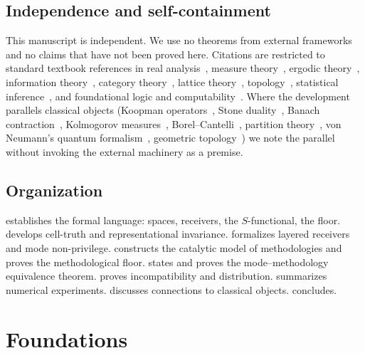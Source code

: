 \documentclass[twocolumn,11pt,a4paper]{article}
\begin{document}
\subsection{Independence and self-containment}

This manuscript is independent. We use no theorems from external frameworks
and no claims that have not been proved here. Citations are restricted to
standard textbook references in real analysis~\cite{rudin1987},
measure theory~\cite{halmos1950}, ergodic theory~\cite{walters1982,birkhoff1931},
information theory~\cite{shannon1948,coverthomas2006,kullback1951},
category theory~\cite{maclane1998}, lattice theory~\cite{birkhoff1967},
topology~\cite{kelley1955}, statistical inference~\cite{lehmann2006,wasserman2004,fisher1925},
and foundational logic and computability~\cite{godel1931,tarski1933,turing1936,chaitin1974}.
Where the development parallels classical objects (Koopman
operators~\cite{koopman1931}, Stone duality~\cite{stone1936},
Banach contraction~\cite{banach1922}, Kolmogorov measures~\cite{kolmogorov1933},
Borel--Cantelli~\cite{borel1909,cantelli1917},
partition theory~\cite{andrews1976}, von Neumann's quantum
formalism~\cite{vonneumann1932}, geometric topology~\cite{nakahara2003}) we
note the parallel without invoking the external machinery as a premise.

\subsection{Organization}

 establishes the formal language: spaces, receivers,
the $S$-functional, the floor.  develops cell-truth and
representational invariance.  formalizes layered receivers
and mode non-privilege.  constructs the catalytic
model of methodologies and proves the methodological floor.
 states and proves the mode--methodology equivalence
theorem.  proves incompatibility and distribution.
 summarizes numerical experiments.
 discusses connections to classical objects.
 concludes.

\section{Foundations}
\label{sec:foundations}
\end{document}
